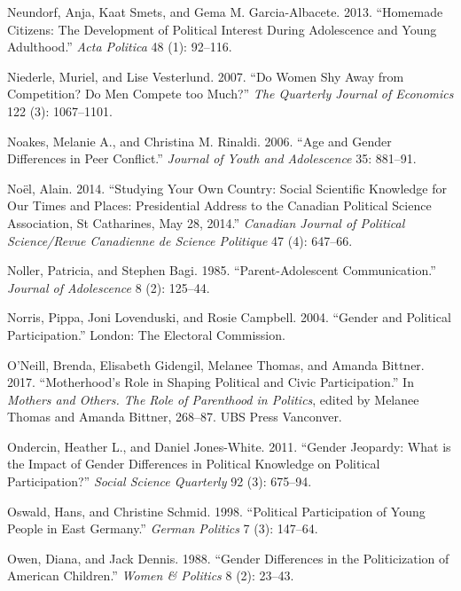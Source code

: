 \documentclass[
  letterpaper,
  DIV=11,
  numbers=noendperiod]{scrreprt}
\newlength{\cslhangindent}
\newenvironment{CSLReferences}[2] %
 {\begin{list}{}{%
  \setlength{\itemindent}{0pt}
  \setlength{\leftmargin}{0pt}
  \setlength{\parsep}{0pt}
  \ifodd #1
   \setlength{\leftmargin}{\cslhangindent}
   \setlength{\itemindent}{-1\cslhangindent}
  \fi
  \setlength{\itemsep}{#2\baselineskip}}}
 {\end{list}}
\begin{document}
\begin{CSLReferences}{1}{0}
Neundorf, Anja, Kaat Smets, and Gema M. Garcia-Albacete. 2013.
{``{Homemade Citizens: The Development of Political Interest During
Adolescence and Young Adulthood}.''} \emph{Acta Politica} 48 (1):
92--116.

Niederle, Muriel, and Lise Vesterlund. 2007. {``{Do Women Shy Away from
Competition? Do Men Compete too Much?}''} \emph{The Quarterly Journal of
Economics} 122 (3): 1067--1101.

Noakes, Melanie A., and Christina M. Rinaldi. 2006. {``{Age and Gender
Differences in Peer Conflict}.''} \emph{Journal of Youth and
Adolescence} 35: 881--91.

Noël, Alain. 2014. {``{Studying Your Own Country: Social Scientific
Knowledge for Our Times and Places: Presidential Address to the Canadian
Political Science Association, St Catharines, May 28, 2014}.''}
\emph{Canadian Journal of Political Science/Revue Canadienne de Science
Politique} 47 (4): 647--66.

Noller, Patricia, and Stephen Bagi. 1985. {``{Parent-Adolescent
Communication}.''} \emph{Journal of Adolescence} 8 (2): 125--44.

Norris, Pippa, Joni Lovenduski, and Rosie Campbell. 2004. {``{Gender and
Political Participation}.''} London: The Electoral Commission.

O'Neill, Brenda, Elisabeth Gidengil, Melanee Thomas, and Amanda Bittner.
2017. {``{Motherhood's Role in Shaping Political and Civic
Participation}.''} In \emph{{Mothers and Others. The Role of Parenthood
in Politics}}, edited by Melanee Thomas and Amanda Bittner, 268--87. UBS
Press Vanconver.

Ondercin, Heather L., and Daniel Jones-White. 2011. {``{Gender Jeopardy:
What is the Impact of Gender Differences in Political Knowledge on
Political Participation?}''} \emph{Social Science Quarterly} 92 (3):
675--94.

Oswald, Hans, and Christine Schmid. 1998. {``{Political Participation of
Young People in East Germany}.''} \emph{German Politics} 7 (3): 147--64.

Owen, Diana, and Jack Dennis. 1988. {``{Gender Differences in the
Politicization of American Children}.''} \emph{Women \& Politics} 8 (2):
23--43.


\end{CSLReferences}
\end{document}
